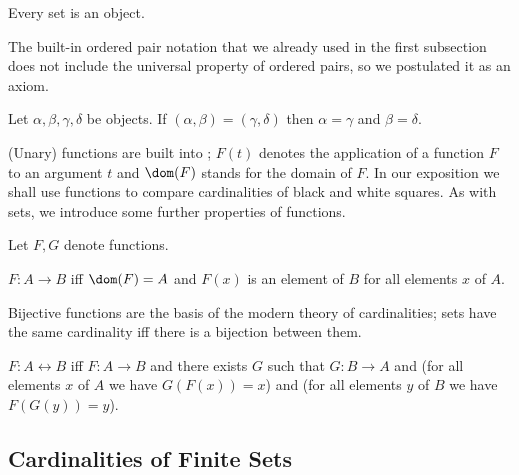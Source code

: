 \begin{forthel}
    \begin{lemma}
        Every set is an object.
    \end{lemma}
\end{forthel}

The built-in ordered pair {notation} that we already used in the first
subsection does not include the universal property of ordered pairs,
so we postulated it as an axiom.

\begin{forthel}
    \begin{axiom}
        Let $\alpha, \beta, \gamma, \delta$ be objects.
        If $(\alpha, \beta) = (\gamma, \delta)$
        then $\alpha = \gamma$ and $\beta = \delta$.
    \end{axiom}
\end{forthel}

(Unary) functions are built into \Naproche{}; $F(t)$ denotes the
application of a function $F$ to an argument $t$ and
$\dom(F)$ stands for the domain of $F$. In our exposition we shall
use functions to compare cardinalities of black and white squares. As with
sets, we introduce some further properties of functions.

\begin{forthel}
    Let $F,G$ denote functions.

    \begin{definition}
        $F : A \to B$ iff $\dom(F) = A$ and
        $F(x)$ is an element of $B$ for all elements $x$ of $A$.
    \end{definition}
\end{forthel}

Bijective functions are the basis of the modern theory of cardinalities; sets
have the same cardinality iff there is a bijection between them.

\begin{forthel}
    \begin{definition}
        $F : A \leftrightarrow B$ iff $F : A \to B$ and there exists $G$ such that
        $G : B \to A$ and
        (for all elements $x$ of $A$ we have $G(F(x)) = x$) and
        (for all elements $y$ of $B$ we have $F(G(y)) = y$).
    \end{definition}
\end{forthel}


\subsection{Cardinalities of Finite Sets}

